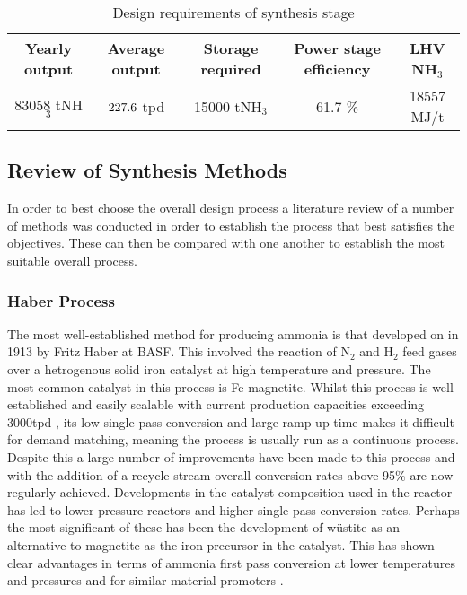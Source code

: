 \begin{table}[!htbp]

	\begin{center}
		\caption{Design requirements of synthesis stage \label{tab:req}}
			
		\begin{tabular}{|c|c|c|c|c|}
			\hline
			Yearly output& Average output & Storage required & Power stage efficiency&LHV NH$_3$     \\ \hline
			83058 tNH$_3$            & $227.6 $  tpd            & 15000 tNH$_3$                          & 61.7 \% &18557 MJ/t \\ \hline
		\end{tabular}
		
	\end{center}
\end{table}

\subsection{Review of Synthesis Methods}

In order to best choose the overall design process a literature review of a number of methods was conducted in order to establish the process that best satisfies the objectives. These can then be compared with one another to establish the most suitable overall process. 

\subsubsection{Haber Process}
The most well-established method for producing ammonia is that developed on in 1913 by Fritz Haber at BASF. This involved the reaction of N$_2$ and H$_2$ feed gases over a hetrogenous solid iron catalyst at high temperature and pressure. The most common catalyst in this process is Fe magnetite. Whilst this process is well established and easily scalable with current production capacities exceeding 3000tpd \cite{Banares-alcantara2014}, its low single-pass conversion and large ramp-up time makes it difficult for demand matching, meaning the process is usually run as a continuous process. Despite this a large number of improvements have been made to this process and with the addition of a recycle stream overall conversion rates above 95\% are now regularly achieved. Developments in the catalyst composition used in the reactor has led to lower pressure reactors and higher single pass conversion rates. Perhaps the most significant of these has been the development of w\"{u}stite as an alternative to magnetite as the iron precursor in the catalyst. This has shown clear advantages in terms of ammonia first pass conversion at lower temperatures and pressures and for similar material promoters\cite{Pernicone2003} \cite{Liu1996}.


